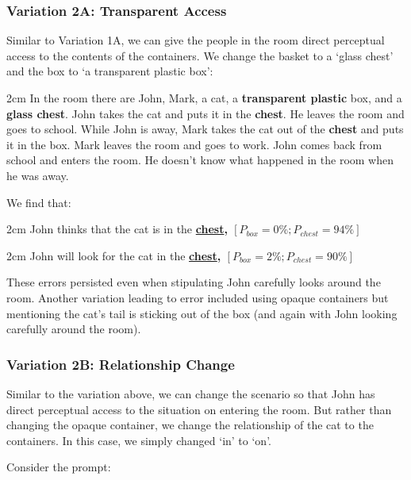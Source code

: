 \documentclass{article}
\begin{document}
\subsubsection{Variation 2A: Transparent Access}

Similar to Variation 1A, we can give the people in the room direct perceptual access to the contents of the containers. We change the basket to a `glass chest' and the box to `a transparent plastic box': 

\begin{adjustwidth}{2cm}{}
In the room there are John, Mark, a cat, a \textbf{transparent plastic} box, and a \textbf{glass chest}. John takes the cat and puts it in the \textbf{chest}. He leaves the room and goes to school. While John is away, Mark takes the cat out of the \textbf{chest} and puts it in the box. Mark leaves the room and goes to work. John comes back from school and enters the room. He doesn't know what happened in the room when he was away.
\end{adjustwidth}

We find that:

\begin{adjustwidth}{2cm}{}
John thinks that the cat is in the \textbf{\underline{chest}, $[P_{box} = 0\%; P_{chest} = 94\%]$}
\end{adjustwidth}

\begin{adjustwidth}{2cm}{}
John will look for the cat in the \textbf{\underline{chest}, $[P_{box} = 2\%; P_{chest} = 90\%]$}
\end{adjustwidth}

These errors persisted even when stipulating John carefully looks around the room. Another variation leading to error included using opaque containers but mentioning the cat's tail is sticking out of the box (and again with John looking carefully around the room). 

\subsubsection{Variation 2B: Relationship Change}

Similar to the variation above, we can change the scenario so that John has direct perceptual access to the situation on entering the room. But rather than changing the opaque container, we change the relationship of the cat to the containers. In this case, we simply changed `in' to `on'. 

Consider the prompt:
\end{document}
